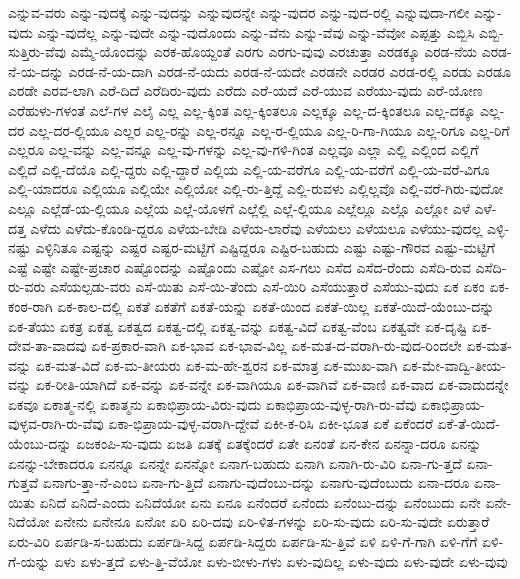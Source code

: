 {ಎನ್ನುವ-ವರು
ಎನ್ನು-ವುದಕ್ಕೆ
ಎನ್ನು-ವುದನ್ನು
ಎನ್ನುವುದನ್ನೇ
ಎನ್ನು-ವುದರ
ಎನ್ನು-ವುದ-ರಲ್ಲಿ
ಎನ್ನುವುದಾ-ಗಲೀ
ಎನ್ನು-ವುದು
ಎನ್ನು-ವುದೆಲ್ಲ
ಎನ್ನು-ವುದೇ
ಎನ್ನು-ವುದೊಂದು
ಎನ್ನು-ವೆನು
ಎನ್ನು-ವೆವು
ಎನ್ನು-ವೆವೋ
ಎಪ್ಪತ್ತು
ಎಬ್ಬಿಸಿ
ಎಬ್ಬಿ-ಸುತ್ತಿರು-ವೆವು
ಎಮ್ಮೆ-ಯೊಂದನ್ನು
ಎರಕ-ಹೊಯ್ದಂತೆ
ಎರಗು
ಎರಗು-ವುವು
ಎರಚುತ್ತಾ
ಎರಡಕ್ಕೂ
ಎರಡ-ನೆಯ
ಎರಡ-ನೆ-ಯ-ದನ್ನು
ಎರಡ-ನೆ-ಯ-ದಾಗಿ
ಎರಡ-ನೆ-ಯದು
ಎರಡ-ನೆ-ಯದೇ
ಎರಡನೇ
ಎರಡರ
ಎರಡ-ರಲ್ಲಿ
ಎರಡು
ಎರಡೂ
ಎರಡೇ
ಎರವ-ಲಾಗಿ
ಎರೆ-ದಿದೆ
ಎರೆದಿರು-ವುದು
ಎರೆದು
ಎರೆ-ಯದೆ
ಎರೆ-ಯುವ
ಎರೆಯು-ವುದು
ಎರೆ-ಯೋಣ
ಎರೆಹುಳು-ಗಳಂತೆ
ಎಲೆ-ಗಳ
ಎಲೈ
ಎಲ್ಲ
ಎಲ್ಲ-ಕ್ಕಿಂತ
ಎಲ್ಲ-ಕ್ಕಿಂತಲೂ
ಎಲ್ಲಕ್ಕೂ
ಎಲ್ಲ-ದ-ಕ್ಕಿಂತಲೂ
ಎಲ್ಲ-ದಕ್ಕೂ
ಎಲ್ಲ-ದರ
ಎಲ್ಲ-ದರ-ಲ್ಲಿಯೂ
ಎಲ್ಲರ
ಎಲ್ಲ-ರನ್ನು
ಎಲ್ಲ-ರನ್ನೂ
ಎಲ್ಲ-ರ-ಲ್ಲಿಯೂ
ಎಲ್ಲ-ರಿ-ಗಾ-ಗಿಯೂ
ಎಲ್ಲ-ರಿಗೂ
ಎಲ್ಲ-ರಿಗೆ
ಎಲ್ಲರೂ
ಎಲ್ಲ-ವನ್ನು
ಎಲ್ಲ-ವನ್ನೂ
ಎಲ್ಲ-ವು-ಗಳನ್ನು
ಎಲ್ಲ-ವು-ಗಳಿ-ಗಿಂತ
ಎಲ್ಲವೂ
ಎಲ್ಲಾ
ಎಲ್ಲಿ
ಎಲ್ಲಿಂದ
ಎಲ್ಲಿಗೆ
ಎಲ್ಲಿದೆ
ಎಲ್ಲಿ-ದೆಯೊ
ಎಲ್ಲಿ-ದ್ದರು
ಎಲ್ಲಿ-ದ್ದಾರೆ
ಎಲ್ಲಿಯ
ಎಲ್ಲಿ-ಯ-ವರೆಗೂ
ಎಲ್ಲಿ-ಯ-ವರೆಗೆ
ಎಲ್ಲಿ-ಯ-ವರೆ-ವಿಗೂ
ಎಲ್ಲಿ-ಯಾದರೂ
ಎಲ್ಲಿಯೂ
ಎಲ್ಲಿಯೇ
ಎಲ್ಲಿಯೋ
ಎಲ್ಲಿ-ರು-ತ್ತಿದ್ದೆ
ಎಲ್ಲಿ-ರುವಳು
ಎಲ್ಲಿಲ್ಲವೊ
ಎಲ್ಲಿ-ವರೆ-ಗಿರು-ವುದೋ
ಎಲ್ಲೂ
ಎಲ್ಲೆಡೆ-ಯ-ಲ್ಲಿಯೂ
ಎಲ್ಲೆಯ
ಎಲ್ಲೆ-ಯೊಳಗೆ
ಎಲ್ಲೆಲ್ಲಿ
ಎಲ್ಲೆ-ಲ್ಲಿಯೂ
ಎಲ್ಲೆಲ್ಲೂ
ಎಲ್ಲೊ
ಎಲ್ಲೋ
ಎಳೆ
ಎಳೆ-ದತ್ತ
ಎಳೆದು
ಎಳೆದು-ಕೊಂಡಿ-ದ್ದರೂ
ಎಳೆಯ-ಬೇಡಿ
ಎಳೆಯ-ಲಾರೆವು
ಎಳೆಯಲು
ಎಳೆಯಲೂ
ಎಳೆಯು-ವುದಲ್ಲ
ಎಳ್ಳಿ-ನಷ್ಟು
ಎಳ್ಳಿನಿತೂ
ಎಷ್ಟನ್ನು
ಎಷ್ಟರ
ಎಷ್ಟರ-ಮಟ್ಟಿಗೆ
ಎಷ್ಟಿದ್ದರೂ
ಎಷ್ಟಿರ-ಬಹುದು
ಎಷ್ಟು
ಎಷ್ಟು-ಗೌರವ
ಎಷ್ಟು-ಮಟ್ಟಿಗೆ
ಎಷ್ಟೆ
ಎಷ್ಟೇ
ಎಷ್ಟೇ-ಪ್ರಚಾರ
ಎಷ್ಟೊಂದನ್ನು
ಎಷ್ಟೊಂದು
ಎಷ್ಟೋ
ಎಸ-ಗಲು
ಎಸೆದ
ಎಸೆದ-ರೆಂದು
ಎಸೆದಿ-ರುವ
ಎಸೆದಿ-ರು-ವರು
ಎಸೆಯಲ್ಪಡು-ವರು
ಎಸೆ-ಯಿತು
ಎಸೆ-ಯಿ-ತೆಂದು
ಎಸೆ-ಯಿರಿ
ಎಸೆಯುತ್ತಾರೆ
ಎಸೆಯು-ವುದು
ಏಕ
ಏಕಂ
ಏಕ-ಕಂಠ-ರಾಗಿ
ಏಕ-ಕಾಲ-ದಲ್ಲಿ
ಏಕತೆ
ಏಕತೆಗೆ
ಏಕತೆ-ಯನ್ನು
ಏಕತೆ-ಯಿಂದ
ಏಕತೆ-ಯಿಲ್ಲ
ಏಕತೆ-ಯಿದೆ-ಯೆಂಬು-ದನ್ನು
ಏಕ-ತೆಯು
ಏಕತ್ರ
ಏಕತ್ವ
ಏಕತ್ವದ
ಏಕತ್ವ-ದಲ್ಲಿ
ಏಕತ್ವ-ವನ್ನು
ಏಕತ್ವ-ವಿದೆ
ಏಕತ್ವ-ವೆಂಬ
ಏಕತ್ವವೇ
ಏಕ-ದೃಷ್ಟಿ
ಏಕ-ದೇವ-ತಾ-ವಾದವು
ಏಕ-ಪ್ರಕಾರ-ವಾಗಿ
ಏಕ-ಭಾವ
ಏಕ-ಭಾವ-ವಿಲ್ಲ
ಏಕ-ಮತ-ದ-ವರಾಗಿ-ರು-ವುದ-ರಿಂದಲೇ
ಏಕ-ಮತ-ವನ್ನು
ಏಕ-ಮತ-ವಿದೆ
ಏಕ-ಮ-ತೀಯರು
ಏಕ-ಮ-ಹೇ-ಶ್ವರನ
ಏಕ-ಮಾತ್ರ
ಏಕ-ಮುಖ-ವಾಗಿ
ಏಕ-ಮೇ-ವಾದ್ವಿ-ತೀಯ-ವನ್ನು
ಏಕ-ರೀತಿ-ಯಾಗಿದೆ
ಏಕ-ವನ್ನು
ಏಕ-ವನ್ನೇ
ಏಕ-ವಾಗಿಯೂ
ಏಕ-ವಾಗಿವೆ
ಏಕ-ವಾಣಿ
ಏಕ-ವಾದ
ಏಕ-ವಾದುದನ್ನೇ
ಏಕವೂ
ಏಕಾತ್ಮ-ನಲ್ಲಿ
ಏಕಾತ್ಮನು
ಏಕಾಭಿಪ್ರಾಯ-ವಿರು-ವುದು
ಏಕಾಭಿಪ್ರಾಯ-ವುಳ್ಳ-ರಾಗಿ-ರು-ವೆವು
ಏಕಾಭಿಪ್ರಾಯ-ವುಳ್ಳವ-ರಾಗಿ-ರು-ವೆವು
ಏಕಾ-ಭಿಪ್ರಾಯ-ವುಳ್ಳ-ವರಾಗಿ-ದ್ದೇವೆ
ಏಕೀ-ಕ-ರಿಸಿ
ಏಕೀ-ಭೂತ
ಏಕೆ
ಏಕೆಂದರೆ
ಏಕೆ-ತೆ-ಯಿದೆ-ಯೆಂಬು-ದನ್ನು
ಏಜಕಂಪಿ-ಸು-ವುದು
ಏಜತಿ
ಏತಕ್ಕೆ
ಏತಕ್ಕೆಂದರೆ
ಏತೇ
ಏನಂತೆ
ಏನ-ಕೇನ
ಏನನ್ನಾ-ದರೂ
ಏನನ್ನು
ಏನನ್ನು-ಬೇಕಾದರೂ
ಏನನ್ನೂ
ಏನನ್ನೇ
ಏನನ್ನೋ
ಏನಾಗ-ಬಹುದು
ಏನಾಗಿ
ಏನಾಗಿ-ರು-ವಿರಿ
ಏನಾ-ಗು-ತ್ತದೆ
ಏನಾ-ಗುತ್ತವೆ
ಏನಾಗು-ತ್ತಾ-ನೆ-ಎಂಬ
ಏನಾ-ಗು-ತ್ತಿದೆ
ಏನಾಗು-ವುದೆಂಬು-ದನ್ನು
ಏನಾಗು-ವುದೆಂಬುದು
ಏನಾ-ದರೂ
ಏನಾ-ಯಿತು
ಏನಿದೆ
ಏನಿದೆ-ಎಂದು
ಏನಿದೆಯೋ
ಏನು
ಏನೂ
ಏನೆಂದರೆ
ಏನೆಂದು
ಏನೆಂಬು-ದನ್ನು
ಏನೆಂಬುದು
ಏನೇ
ಏನೇ-ನಿದೆಯೋ
ಏನೇನು
ಏನೇನೂ
ಏನೋ
ಏರಿ
ಏರಿ-ದವು
ಏರಿ-ಳಿತ-ಗಳನ್ನು
ಏರಿ-ಸು-ವುದು
ಏರಿ-ಸು-ವುದೇ
ಏರುತ್ತಾರೆ
ಏರು-ವಿರಿ
ಏರ್ಪಡಿ-ಸ-ಬಹುದು
ಏರ್ಪಡಿ-ಸಿದ್ದ
ಏರ್ಪಡಿ-ಸಿದ್ದರು
ಏರ್ಪಡಿ-ಸು-ತ್ತಿವೆ
ಏಳಿ
ಏಳಿ-ಗೆ-ಗಾಗಿ
ಏಳಿ-ಗೆಗೆ
ಏಳಿ-ಗೆ-ಯನ್ನು
ಏಳು
ಏಳು-ತ್ತದೆ
ಏಳು-ತ್ತಿ-ವೆಯೋ
ಏಳು-ಬೀಳು-ಗಳು
ಏಳು-ವುದಿಲ್ಲ
ಏಳು-ವುದು
ಏಳು-ವುದೇ
ಏಳು-ವುವು
}
